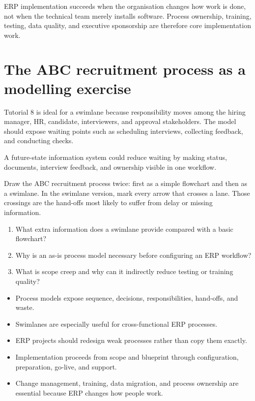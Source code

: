 \begin{keyidea}
ERP implementation succeeds when the organisation changes how work is done, not when the technical team merely installs software. Process ownership, training, testing, data quality, and executive sponsorship are therefore core implementation work.
\end{keyidea}

\section{The ABC recruitment process as a modelling exercise}

Tutorial 8 is ideal for a swimlane because responsibility moves among the hiring manager, HR, candidate, interviewers, and approval stakeholders. The model should expose waiting points such as scheduling interviews, collecting feedback, and conducting checks.

A future-state information system could reduce waiting by making status, documents, interview feedback, and ownership visible in one workflow.

\begin{tryit}
Draw the ABC recruitment process twice: first as a simple flowchart and then as a swimlane. In the swimlane version, mark every arrow that crosses a lane. Those crossings are the hand-offs most likely to suffer from delay or missing information.
\end{tryit}

\begin{quickcheck}
\begin{enumerate}
  \item What extra information does a swimlane provide compared with a basic flowchart?
  \item Why is an as-is process model necessary before configuring an ERP workflow?
  \item What is scope creep and why can it indirectly reduce testing or training quality?
\end{enumerate}
\end{quickcheck}

\begin{chapterrecap}
\begin{itemize}
  \item Process models expose sequence, decisions, responsibilities, hand-offs, and waste.
  \item Swimlanes are especially useful for cross-functional ERP processes.
  \item ERP projects should redesign weak processes rather than copy them exactly.
  \item Implementation proceeds from scope and blueprint through configuration, preparation, go-live, and support.
  \item Change management, training, data migration, and process ownership are essential because ERP changes how people work.
\end{itemize}
\end{chapterrecap}
